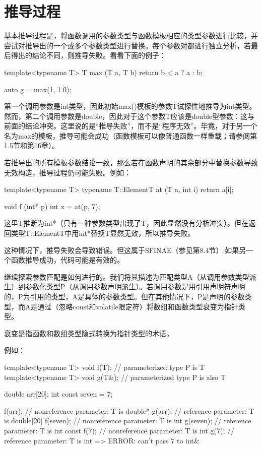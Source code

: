 \section{推导过程}
基本推导过程是，将函数调用的参数类型与函数模板相应的类型参数进行比较，并尝试对推导出的一个或多个参数类型进行替换。每个参数对都进行独立分析，若最后得出的结论不同，则推导失败。看看下面的例子：
 
\begin{cpp}
template<typename T>
T max (T a, T b) {
	return b < a ? a : b;
}

auto g = max(1, 1.0);
\end{cpp} 
 
第一个调用参数是int类型，因此初始max()模板的参数T试探性地推导为int类型。然而，第二个调用参数是double，因此对于这个参数T应该是double型参数：这与前面的结论冲突。这里说的是“推导失败”，而不是“程序无效”。毕竟，对于另一个名为max的模板，推导可能会成功（函数模板可以像普通函数一样重载；请参阅第1.5节和第16章）。
 
若推导出的所有模板参数结论一致，那么若在函数声明的其余部分中替换参数导致无效构造，推导过程仍可能失败。例如：

\begin{cpp}
template<typename T>
typename T::ElementT at (T a, int i) {
	return a[i];
}

void f (int* p) {
	int x = at(p, 7);
}
\end{cpp} 

这里T推断为int*（只有一种参数类型出现了T，因此显然没有分析冲突）。但在返回类型T::ElementT中用int*替换T显然无效，所以推导失败。

\begin{notice}
这种情况下，推导失败会导致错误。但这属于SFINAE（参见第8.4节）:如果另一个函数推导成功，代码可能是有效的。
\end{notice}

继续探索参数匹配是如何进行的。我们将其描述为匹配类型A（从调用参数类型派生）到参数化类型P（从调用参数声明派生）。若调用参数是用引用声明符声明的，P为引用的类型，A是具体的参数类型。但在其他情况下，P是声明的参数类型，而A是通过（忽略const和volatile限定符）将数组和函数类型衰变为指针类型。

\begin{notice}
衰变是指函数和数组类型隐式转换为指针类型的术语。
\end{notice}

例如：

\begin{cpp}
template<typename T> void f(T); // parameterized type P is T
template<typename T> void g(T&); // parameterized type P is also T

double arr[20];
int const seven = 7;

f(arr); // nonreference parameter: T is double*
g(arr); // reference parameter: T is double[20]
f(seven); // nonreference parameter: T is int
g(seven); // reference parameter: T is int const
f(7); // nonreference parameter: T is int
g(7); // reference parameter: T is int => ERROR: can't pass 7 to int&
\end{cpp} 

